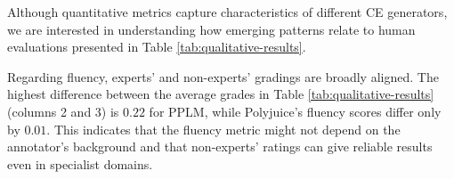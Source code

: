 \documentclass[11pt]{article}
\begin{document}
Although quantitative metrics capture characteristics of different CE generators, we are interested in understanding how emerging patterns relate to human evaluations presented in Table \ref{tab:qualitative-results}. 

\begin{table}[!b]
\centering
{}
\caption{Results of the human annotation of the counterfactuals using the qualitative metrics. Each counterfactual receives five ratings, which we average. We display the averages of those averages and their standard deviations. Since the expert evaluations are performed on a subset of five samples, we show the fluency scores the non-experts give on the same set of samples.}
\label{tab:qualitative-results}
\end{table}

Regarding fluency, experts' and non-experts' gradings are broadly aligned. The highest difference between the average grades in Table \ref{tab:qualitative-results} (columns 2 and 3) is $0.22$ for PPLM, while Polyjuice's fluency scores differ only by $0.01$. This indicates that the fluency metric might not depend on the annotator's background and that non-experts' ratings can give reliable results even in specialist domains. 
\end{document}
